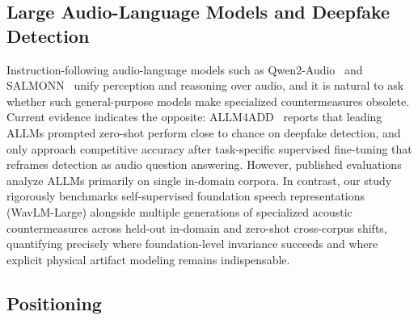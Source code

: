 \subsection{Large Audio-Language Models and Deepfake Detection}
\label{ssec:related-allm}

Instruction-following audio-language models such as Qwen2-Audio~\cite{chu2024qwen2audio}
and SALMONN~\cite{tang2024salmonn} unify perception and reasoning over audio, and it
is natural to ask whether such general-purpose models make specialized countermeasures
obsolete. Current evidence indicates the opposite: ALLM4ADD~\cite{gong2025allm4add}
reports that leading ALLMs prompted zero-shot perform close to chance on deepfake
detection, and only approach competitive accuracy after task-specific supervised
fine-tuning that reframes detection as audio question answering. However, published
evaluations analyze ALLMs primarily on single in-domain corpora. In contrast, our study
rigorously benchmarks self-supervised foundation speech representations (WavLM-Large)
alongside multiple generations of specialized acoustic countermeasures across held-out
in-domain and zero-shot cross-corpus shifts, quantifying precisely where foundation-level
invariance succeeds and where explicit physical artifact modeling remains indispensable.

\subsection{Positioning}
\label{ssec:related-positioning}

